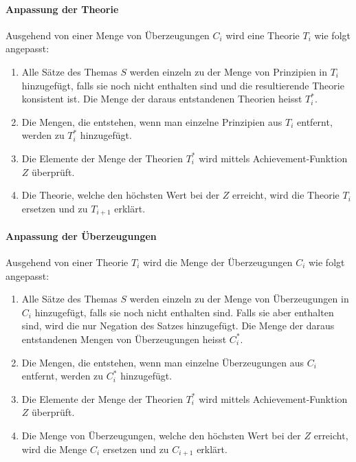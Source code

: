 \documentclass{article}
\begin{document}
\paragraph{Anpassung der Theorie}
Ausgehend von einer Menge von Überzeugungen $C_i$ wird eine Theorie $T_i$ wie folgt angepasst: 
\begin{enumerate}
    \item \label{1} Alle Sätze des Themas $S$ werden einzeln zu der Menge von Prinzipien in $T_i$ hinzugefügt, falls sie noch nicht enthalten sind und die resultierende Theorie konsistent ist. Die Menge der daraus entstandenen Theorien heisst $T_i^*$.
    \item \label{2}Die Mengen, die entstehen, wenn man einzelne Prinzipien aus $T_i$ entfernt, werden zu $T_i^*$ hinzugefügt.
    \item \label{3}Die Elemente der Menge der Theorien $T_i^*$ wird mittels Achievement-Funktion $Z$ überprüft.
    \item \label{4}Die Theorie, welche den höchsten Wert bei der $Z$ erreicht, wird die Theorie $T_i$ ersetzen und zu $T_{i+1}$ erklärt.
\end{enumerate}

\paragraph{Anpassung der Überzeugungen}
Ausgehend von einer Theorie $T_i$ wird die Menge der Überzeugungen $C_i$ wie folgt angepasst:
\begin{enumerate}
    \item \label{c1} Alle Sätze des Themas $S$ werden einzeln zu der Menge von Überzeugungen in $C_i$ hinzugefügt, falls sie noch nicht enthalten sind. Falls sie aber enthalten sind, wird die nur Negation des Satzes hinzugefügt. Die Menge der daraus entstandenen Mengen von Überzeugungen heisst $C_i^*$.
    \item \label{c2} Die Mengen, die entstehen, wenn man einzelne Überzeugungen aus $C_i$ entfernt, werden zu $C_i^*$ hinzugefügt.
    \item \label{c3} Die Elemente der Menge der Theorien $T_i^*$ wird mittels Achievement-Funktion $Z$ überprüft.
    \item \label{c4}Die Menge von Überzeugungen, welche den höchsten Wert bei der $Z$ erreicht, wird die Menge $C_i$ ersetzen und zu $C_{i+1}$ erklärt.
\end{enumerate}
\end{document}
